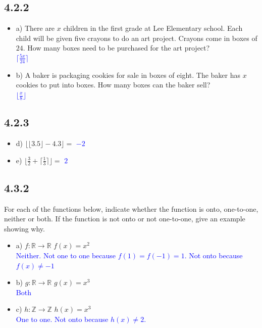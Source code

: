 \documentclass{article}
\begin{document}
\subsection*{4.2.2}
\begin{itemize}
    \item a) There are $x$ children in the first grade at Lee Elementary school. Each child will be given five crayons to do an art project. Crayons come in boxes of $24$. How many boxes need to be purchased for the art project? \\
    \textcolor{blue}{$\lceil \frac{5x}{24} \rceil$}
    \item b) A baker is packaging cookies for sale in boxes of eight. The baker has $x$ cookies to put into boxes. How many boxes can the baker sell? \\
    \textcolor{blue}{$\lfloor \frac{x}{8} \rfloor$}
\end{itemize}

\subsection*{4.2.3}
\begin{itemize}
    \item d) $\lfloor \lfloor 3.5 \rfloor - 4.3 \rfloor = $ \textcolor{blue}{$-2$}
    \item e) $\lfloor \frac{3}{2} + \lceil \frac{1}{3} \rceil \rfloor = $ \textcolor{blue}{$2$}
\end{itemize}

\subsection*{4.3.2}
For each of the functions below, indicate whether the function is onto, one-to-one, neither or both. If the function is not onto or not one-to-one, give an example showing why.
\begin{itemize}
    \item a) $f: \mathbb{R} \rightarrow \mathbb{R}$ $f(x) = x^2$ \\
    \textcolor{blue}{Neither. Not one to one because $f(1) = f(-1) = 1$. Not onto because $f(x) \ne -1$ }
    \item b) $g: \mathbb{R} \rightarrow \mathbb{R}$ $g(x) = x^3$ \\
    \textcolor{blue}{Both}
    \item c) $h: \mathbb{Z} \rightarrow \mathbb{Z}$ $h(x) = x^3$ \\
    \textcolor{blue}{One to one. Not onto because $h(x) \ne 2$.}
\end{itemize}
\end{document}
